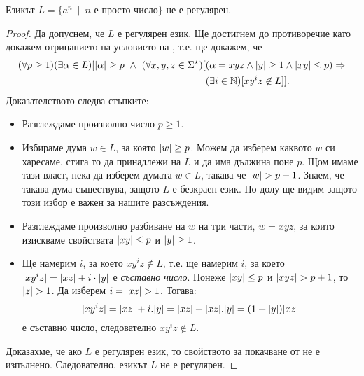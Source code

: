 \begin{example}
  Езикът $L = \{a^n\ \mid\ n\mbox{ е просто число}\}$ не е регулярен.
\end{example}
\begin{proof}
  Да допуснем, че $L$ е регулярен език. Ще достигнем до противоречие като докажем отрицанието на условието на ,
  т.е. ще докажем, че
  \begin{align*}
    (\forall p \geq 1)(\exists \alpha \in L)[\abs{\alpha} \geq p\ \wedge\ (\forall x,y,z\in\Sigma^\star)[ & (\alpha = xyz \wedge \abs{y} \geq 1\wedge \abs{xy} \leq p) \Rightarrow\\
    & (\exists i\in\Nat)[xy^iz \not\in L]].
  \end{align*}
  Доказателството следва стъпките:
  \begin{itemize}
  \item 
    Разглеждаме произволно число $p \geq 1$.
  \item
    Избираме дума $w \in L$, за която $\lvert{w}\rvert \geq p$. Можем да изберем каквото $w$ 
    си харесаме, стига то да принадлежи на $L$ и да има дължина поне $p$.
    Щом имаме тази власт, нека да изберем думата $w \in L$, такава че $\lvert{w}\rvert > p+1$.
    Знаем, че такава дума съществува, защото $L$ е безкраен език. По-долу ще видим защото този избор е важен за нашите разсъждения.
  \item
    Разглеждаме произволно разбиване на $w$ на три части, $w = xyz$,
    за които изискваме свойствата $\lvert{xy}\rvert \leq p$ и $\lvert{y}\rvert \geq 1$.
  \item
    Ще намерим $i$, за което $xy^iz \not\in L$,
    т.е. ще намерим $i$, за което 
    $\lvert{xy^iz}\rvert = \lvert{xz}\rvert + i\cdot\lvert{y}\rvert$ е {\em съставно число}.
    Понеже $\lvert{xy}\rvert \leq p$ и $\lvert{xyz}\rvert > p+1$, то $\lvert{z}\rvert > 1$.
    Да изберем $i = \lvert{xz}\rvert > 1$. Тогава:
    \[\lvert{xy^iz}\rvert = \lvert{xz}\rvert + i.\lvert{y}\rvert = \lvert{xz}\rvert + \lvert{xz}\rvert.\lvert{y}\rvert = (1 + \lvert{y}\rvert)\lvert{xz}\rvert\] е съставно число, следователно 
    $xy^iz \not\in L$.
  \end{itemize}
  Доказахме, че ако $L$ е регулярен език, то свойството за покачване от  не е изпълнено. Следователно, езикът $L$
  не е регулярен.  
\end{proof}

